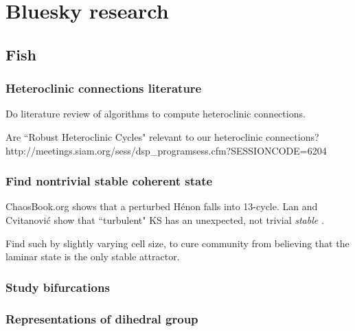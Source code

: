 
\chapter{Bluesky research}
\label{bluesky}

\section{Fish}

\subsection{Heteroclinic connections literature}

Do literature review of algorithms to
compute heteroclinic connections.

Are ``Robust Heteroclinic Cycles" relevant to our heteroclinic connections?
\\
http://meetings.siam.org/sess/dsp\_programsess.cfm?SESSIONCODE=6204

\subsection{Find nontrivial stable coherent state}

ChaosBook.org shows that a perturbed H\'enon falls into 13-cycle.
Lan and Cvitanovi{\'c} show that ``turbulent" KS has an
unexpected, not trivial {\em stable} \eqv.

Find such by slightly varying cell size,
to cure community from believing that
the laminar state is the only stable attractor.

\subsection{Study bifurcations}

\subsection{Representations of dihedral group}

